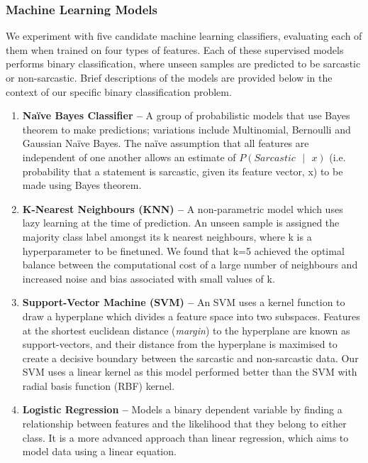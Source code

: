 \documentclass[12pt,a4paper]{article}
\begin{document}
\subsubsection{Machine Learning Models}
We experiment with five candidate machine learning classifiers, evaluating each of them when trained on four types of features. Each of these supervised models performs binary classification, where unseen samples are predicted to be sarcastic or non-sarcastic. Brief descriptions of the models are provided below in the context of our specific binary classification problem. \vspace{-3pt}

\begin{enumerate}
	\item \textbf{Na\"{i}ve Bayes Classifier --} A group of probabilistic models that use Bayes theorem to make predictions; variations include Multinomial, Bernoulli and Gaussian Na\"{i}ve Bayes. The na\"{i}ve assumption that all features are independent of one another allows an estimate of ${P(Sarcastic \text{ }| \text{ }x)}$ (i.e. probability that a statement is sarcastic, given its feature vector, x) to be made using Bayes theorem.\vspace{-3pt}
	
	\item \textbf{K-Nearest Neighbours (KNN) --} A non-parametric model which uses lazy learning at the time of prediction. An unseen sample is assigned the majority class label amongst its k nearest neighbours, where k is a hyperparameter to be finetuned. We found that k=5 achieved the optimal balance between the computational cost of a large number of neighbours and increased noise and bias associated with small values of k.\vspace{-3pt}
	
	\item \textbf{Support-Vector Machine (SVM) --} An SVM \cite{cortes1995support} uses a kernel function to draw a hyperplane which divides a feature space into two subspaces. Features at the shortest euclidean distance (\textit{margin}) to the hyperplane are known as support-vectors, and their distance from the hyperplane is maximised to create a decisive boundary between the sarcastic and non-sarcastic data. Our SVM uses a linear kernel as this model performed better than the SVM with radial basis function (RBF) kernel.\vspace{-3pt}

	\item \textbf{Logistic Regression --} Models a binary dependent variable by finding a relationship between features and the likelihood that they belong to either class. It is a more advanced approach than linear regression, which aims to model data using a linear equation.\vspace{-3pt}


\end{enumerate}
\end{document}
